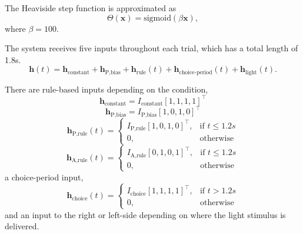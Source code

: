 \documentclass[11pt]{article}
\begin{document}
The Heaviside step function is approximated as
\begin{equation}
\Theta(\mathbf{x}) = \text{sigmoid}(\beta \mathbf{x}),
\end{equation}
where $\beta = 100$.

The system receives five inputs throughout each trial, which has a total length of 1.8s.
\begin{equation}
\mathbf{h}(t) = \mathbf{h}_{\text{constant}} + \mathbf{h}_{\text{P,bias}} + \mathbf{h}_{\text{rule}}(t) + \mathbf{h}_{\text{choice-period}}(t) + \mathbf{h}_{\text{light}}(t).
\end{equation}

There are rule-based inputs depending on the condition,
\begin{equation} 
\mathbf{h}_{\text{constant}} = I_{\text{constant}} [1, 1, 1, 1]^\top
\end{equation}
\begin{equation} 
\mathbf{h}_{\text{P,bias}} = I_{\text{P,bias}} [1, 0, 1, 0]^\top
\end{equation}
\begin{equation} \mathbf{h}_{\text{P,rule}}(t) = \begin{cases}
                           I_{\text{P,rule}} [1, 0, 1, 0]^\top,& \text{if } t\leq 1.2s \\
                            0,              & \text{otherwise}
                         \end{cases}
\end{equation}
\begin{equation} \mathbf{h}_{\text{A,rule}}(t) = \begin{cases}
                           I_{\text{A,rule}} [0, 1, 0, 1]^\top,& \text{if } t\leq 1.2s \\
                            0,              & \text{otherwise}
                         \end{cases}
\end{equation}
a choice-period input,
\begin{equation} \mathbf{h}_{\text{choice}}(t) = \begin{cases}
                           I_{\text{choice}} [1, 1, 1, 1]^\top,& \text{if } t > 1.2s \\
                            0,              & \text{otherwise}
                         \end{cases}
\end{equation}
and an input to the right or left-side depending on where the light stimulus is delivered.     
\end{document}
